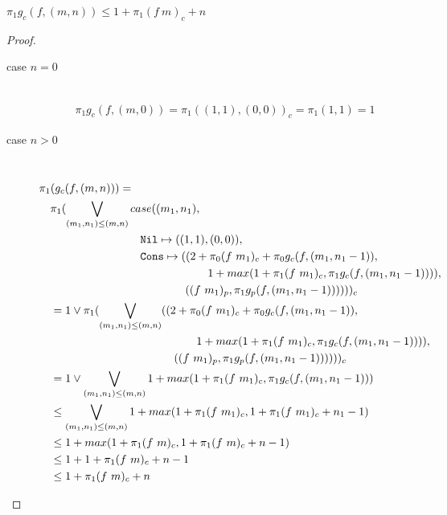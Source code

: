 \begin{theorem}
  $\pi_1 g_c(f, (m, n)) \leq 1 + \pi_1 (f\ m)_c + n$
\end{theorem}
\begin{proof}
  \begin{description}
    \item[case $n=0$]\mbox{}\\[-1.5\baselineskip]
      \begin{align*}
      \pi_1 g_c(f, (m, 0)) = \pi_1((1, 1), (0, 0))_c = \pi_1(1, 1) = 1
      \end{align*}
    \item[case $n>0$]\mbox{}\\[-1.5\baselineskip]
      \[\begin{split}
        &\pi_1(g_c(f, (m, n))) = \\
        &\quad \pi_1(\bigvee\limits_{(m_1, n_1) \leq (m, n)} case((m_1, n_1), \\
        &\quadfive\quadfour \T{Nil} \mapsto ((1, 1), (0, 0)), \\
        &\quadfive\quadfour \T{Cons} \mapsto ((2 + \pi_0(f\ m_1)_c + \pi_0g_c(f, (m_1, n_1-1)), \\
        &\quadfive\quadten                     1 + max(1 + \pi_1(f\ m_1)_c, \pi_1g_c(f, (m_1, n_1-1)))), \\
        &\quadfive\quadeight                  ((f\ m_1)_p, \pi_1 g_p(f, (m_1, n_1-1))))) )_c \\
        &\quad = 1 \vee \pi_1(\bigvee\limits_{(m_1, n_1) \leq (m, n)} ((2 + \pi_0(f\ m_1)_c + \pi_0g_c(f, (m_1, n_1-1)), \\
        &\quadfour\quadten                     1 + max(1 + \pi_1(f\ m_1)_c, \pi_1g_c(f, (m_1, n_1-1)))), \\
        &\quadfour\quadeight                  ((f\ m_1)_p, \pi_1 g_p(f, (m_1, n_1-1))))) )_c \\
        &\quad = 1 \vee \bigvee\limits_{(m_1, n_1) \leq (m, n)} 1 + max(1 + \pi_1 (f\ m_1)_c, \pi_1 g_c(f, (m_1, n_1-1))) \\
        &\quad \leq \bigvee\limits_{(m_1, n_1) \leq (m, n)} 1 + max(1 + \pi_1 (f\ m_1)_c, 1 + \pi_1 (f\ m_1)_c + n_1 - 1) \\
        &\quad \leq 1 + max(1 + \pi_1 (f\ m)_c, 1 + \pi_1 (f\ m)_c + n - 1) \\
        &\quad \leq 1 + 1 + \pi_1 (f\ m)_c + n - 1 \\
        &\quad \leq 1 + \pi_1 (f\ m)_c + n
      \end{split}\]
  \end{description}
\end{proof}


